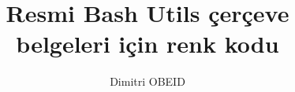 \documentclass[a4paper,10pt]{article}
\title{\color{red}Resmi \color{orange}Bash \color{yellow}Utils \color{green}çerçeve \\\color{blue}belgeleri \color{violet}için \color{red}renk \color{orange}kodu}\color{text}
\author{Dimitri OBEID}
\begin{document}
    \maketitle
    \newpage

    \hypertarget{contents}{}
    \tableofcontents
    \newpage

    \color{sec1}
    \section{}\color{text}




\end{document}
